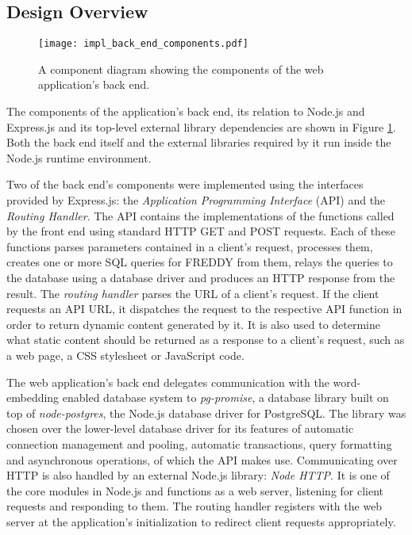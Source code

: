 \subsection{Design Overview}
\begin{figure}
	\centering\texttt{[image: impl\_back\_end\_components.pdf]}
	\caption{A component diagram showing the components of the web application's back end.}
	\label{fig:back_end_components}
\end{figure}
The components of the application's back end, its relation to Node.js and Express.js and its top-level external library dependencies are shown in Figure \ref{fig:back_end_components}. Both the back end itself and the external libraries required by it run inside the Node.js runtime environment. 

Two of the back end's components were implemented using the interfaces provided by Express.js: the \textit{Application Programming Interface} (API) and the \textit{Routing Handler}. The API contains the implementations of the functions called by the front end using standard HTTP GET and POST requests. Each of these functions parses parameters contained in a client's request, processes them, creates one or more SQL queries for FREDDY from them, relays the queries to the database using a database driver and produces an HTTP response from the result. The \textit{routing handler} parses the URL of a client's request. If the client requests an API URL, it dispatches the request to the respective API function in order to return dynamic content generated by it. It is also used to determine what static content should be returned as a response to a client's request, such as a web page, a CSS stylesheet or JavaScript code.

The web application's back end delegates communication with the word-embedding enabled database system to \textit{pg-promise}, a database library built on top of \textit{node-postgres}, the Node.js database driver for PostgreSQL. The library was chosen over the lower-level database driver for its features of automatic connection management and pooling, automatic transactions, query formatting and asynchronous operations, of which the API makes use. Communicating over HTTP is also handled by an external Node.js library: \textit{Node HTTP}. It is one of the core modules in Node.js and functions as a web server, listening for client requests and responding to them. The routing handler registers with the web server at the application's initialization to redirect client requests appropriately.

